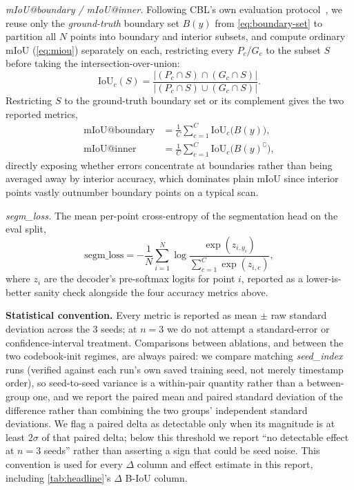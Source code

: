 \documentclass{article}
\theoremstyle{plain}
\theoremstyle{definition}
\theoremstyle{remark}
\begin{document}
\emph{mIoU@boundary / mIoU@inner.} Following CBL's own evaluation
protocol~\cite{tang2022contrastive}, we reuse only the \emph{ground-truth}
boundary set $B(y)$ from \cref{eq:boundary-set} to partition all $N$ points
into boundary and interior subsets, and compute ordinary mIoU
(\cref{eq:miou}) separately on each, restricting every $P_c$/$G_c$ to the
subset $S$ before taking the intersection-over-union:
\begin{equation}
  \text{IoU}_c(S) = \frac{|(P_c \cap S) \cap (G_c \cap S)|}{|(P_c \cap S) \cup (G_c \cap S)|}.
  \label{eq:iou-subset}
\end{equation}
Restricting $S$ to the ground-truth boundary set or its complement gives the
two reported metrics,
\begin{align}
  \text{mIoU@boundary} &= \frac{1}{C}\sum_{c=1}^{C} \text{IoU}_c\big(B(y)\big), \label{eq:miou-boundary} \\
  \text{mIoU@inner} &= \frac{1}{C}\sum_{c=1}^{C} \text{IoU}_c\big(B(y)^{\complement}\big), \label{eq:miou-inner}
\end{align}
directly exposing whether errors concentrate at boundaries rather than being
averaged away by interior accuracy, which dominates plain mIoU since interior
points vastly outnumber boundary points on a typical scan.

\emph{segm\_loss.} The mean per-point cross-entropy of the segmentation head
on the eval split,
\begin{equation}
  \text{segm\_loss} = -\frac{1}{N}\sum_{i=1}^{N} \log \frac{\exp(z_{i, y_i})}{\sum_{c=1}^{C} \exp(z_{i,c})},
  \label{eq:segloss}
\end{equation}
where $z_i$ are the decoder's pre-softmax logits for point $i$, reported as a
lower-is-better sanity check alongside the four accuracy metrics above.

\textbf{Statistical convention.} Every metric is reported as mean $\pm$ raw
standard deviation across the 3 seeds; at $n{=}3$ we do not attempt a
standard-error or confidence-interval treatment. Comparisons between
ablations, and between the two codebook-init regimes, are always paired: we
compare matching \emph{seed\_index} runs (verified against each run's own
saved training seed, not merely timestamp order), so seed-to-seed variance is
a within-pair quantity rather than a between-group one, and we report the
paired mean and paired standard deviation of the difference rather than
combining the two groups' independent standard deviations. We flag a paired
delta as detectable only when its magnitude is at least $2\sigma$ of that
paired delta; below this threshold we report ``no detectable effect at
$n{=}3$ seeds'' rather than asserting a sign that could be seed noise. This
convention is used for every $\Delta$ column and effect estimate in this
report, including \cref{tab:headline}'s $\Delta$ B-IoU column.
\end{document}

